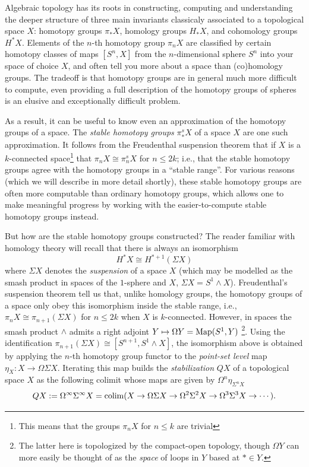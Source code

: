 

Algebraic topology has its roots in constructing, computing and understanding the deeper structure of three main invariants classicaly associated to a topological space $X$: homotopy groups $\pi_* X$, homology groups $H_*X$, and cohomology groups $H^*X$. Elements of the $n$-th homotopy group $\pi_n X$ are classified by certain homotopy classes of maps $[S^n, X]$ from the $n$-dimensional sphere $S^n$ into your space of choice $X$, and often tell you more about a space than (co)homology groups. The tradeoff is that homotopy groups are in general much more difficult to compute, even providing a full description of the homotopy groups of spheres is an elusive and exceptionally difficult problem.

As a result, it can be useful to know even an approximation of the homotopy groups of a space. The \textit{stable homotopy groups} $\pi_*^sX$ of a space $X$ are one such approximation. It follows from the Freudenthal suspension theorem that if $X$ is a $k$-connected space\footnote{This means that the groups $\pi_n X$ for $n\leq k$ are trivial} that $\pi_n X\cong \pi_n^sX$ for $n\leq 2k$; i.e., that the stable homotopy groups agree with the homotopy groups in a ``stable range''. For various reasons (which we will describe in more detail shortly), these stable homotopy groups are often more computable than ordinary homotopy groups, which allows one to make meaningful progress by working with the easier-to-compute stable homotopy groups instead.

But how are the stable homotopy groups constructed? The reader familiar with homology theory will recall that there is always an isomorphism \begin{equation} \label{eq:homology-iso} H^*X\cong H^{*+1}(\Sigma X)\end{equation}  where $\Sigma X$ denotes the \textit{suspension} of a space $X$ (which may be modelled as the smash product in spaces of the $1$-sphere and $X$, $\Sigma X=S^1\wedge X$). Freudenthal's suspension theorem tell us that, unlike homology groups, the homotopy groups of a space only obey this isomorphism inside the stable range, i.e., $\pi_nX\cong \pi_{n+1}(\Sigma X)$ for $n\leq 2k$ when $X$ is $k$-connected. However, in spaces the smash product $\wedge$ admits a right adjoint $Y\mapsto \Omega Y=\operatorname{Map}(S^1,Y)$ \footnote{The latter here is topologized by the compact-open topology, though $\Omega Y$ can more easily be thought of as the \textit{space} of loops in $Y$ based at $*\in Y$.}. Using the identification $\pi_{n+1}(\Sigma X)\cong [S^{n+1}, S^1 \wedge X]$, the isomorphism above is obtained by applying the $n$-th homotopy group functor to the \textit{point-set level} map $\eta_X \colon X\to \Omega \Sigma X$. Iterating this map builds the \textit{stabilization} $QX$ of a topological space $X$ as the following colimit whose maps are given by $\Omega^n \eta_{\Sigma^n X}$ \[ QX:= \Omega^{\infty} \Sigma^{\infty} X=\operatorname{colim}( X\to \Omega \Sigma X\to \Omega^2 \Sigma^2 X\to \Omega^3 \Sigma^3 X \to \cdots).\]

